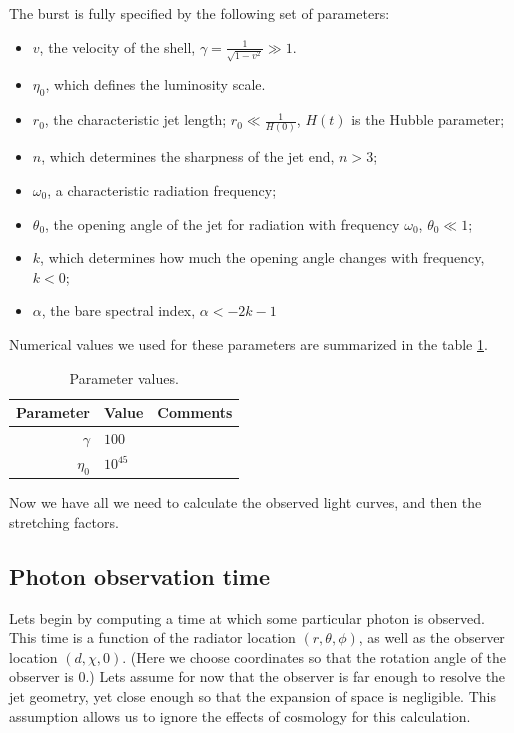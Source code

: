 \documentclass{article}
\begin{document}
The burst is fully specified by the following set of parameters:
\begin{itemize}
\item{$v$, the velocity of the shell, $\gamma = \frac{1}{\sqrt{1-v^2}} \gg 1$.}
\item{$\eta_0$, which defines the luminosity scale.}
\item{$r_0$, the characteristic jet length; $r_0 \ll \frac{1}{H\left(0\right)}$, $H\left(t\right)$ is the Hubble parameter;}
\item{$n$, which determines the sharpness of the jet end, $n > 3$;}
\item{$\omega_0$, a characteristic radiation frequency;}
\item{$\theta_0$, the opening angle of the jet for radiation with frequency $\omega_0$, $\theta_0 \ll 1$;}
\item{$k$, which determines how much the opening angle changes with frequency, $k < 0$;}
\item{$\alpha$, the bare spectral index, $\alpha < -2k - 1$}
\end{itemize}

Numerical values we used for these parameters are summarized in the table \ref{tab:parameters}.

\begin{table}
	\centering
	\small
	\begin{tabular}{ r | l | l }
		Parameter	&	Value			&	Comments \\
		\hline
		$\gamma$		&	$100$		&	\\
		$\eta_0$		&	$10^{45}$	&
	\end{tabular}
	\caption{Parameter values.}
	\label{tab:parameters}
\end{table}

Now we have all we need to calculate the observed light curves, and then the stretching factors.

\subsection{Photon observation time}

Lets begin by computing a time at which some particular photon is observed. This time is a function of the radiator location $\left(r, \theta, \phi\right)$, as well as the observer location $\left(d, \chi, 0\right)$. (Here we choose coordinates so that the rotation angle of the observer is $0$.) Lets assume for now that the observer is far enough to resolve the jet geometry, yet close enough so that the expansion of space is negligible. This assumption allows us to ignore the effects of cosmology for this calculation.
\end{document}
